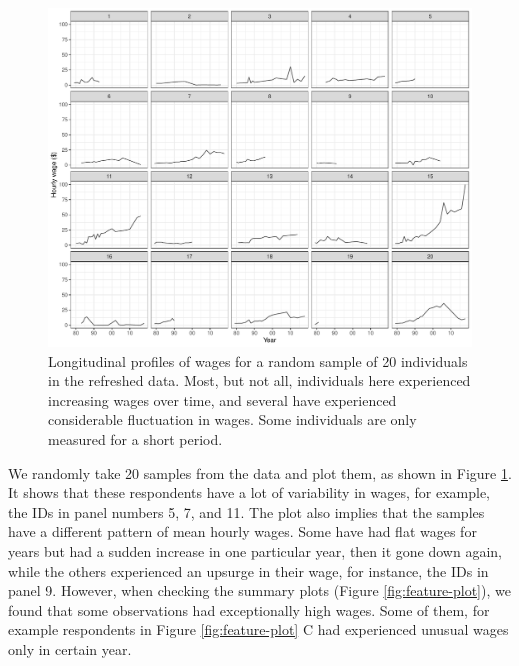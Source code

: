 \documentclass{article}
\begin{document}
\begin{figure}

{\centering \includegraphics[width=1\linewidth]{figures/sample-plot-1} 

}

\caption{Longitudinal profiles of wages for a random sample of 20 individuals in the refreshed data. Most, but not all, individuals here experienced increasing wages over time, and several have experienced considerable fluctuation in wages. Some individuals are only measured for a short period.}\label{fig:sample-plot}
\end{figure}

We randomly take 20 samples from the data and plot them, as shown in Figure \ref{fig:sample-plot}. It shows that these respondents have a lot of variability in wages, for example, the IDs in panel numbers 5, 7, and 11. The plot also implies that the samples have a different pattern of mean hourly wages. Some have had flat wages for years but had a sudden increase in one particular year, then it gone down again, while the others experienced an upsurge in their wage, for instance, the IDs in panel 9.
However, when checking the summary plots (Figure \ref{fig:feature-plot}), we found that some observations had exceptionally high wages. Some of them, for example respondents in Figure \ref {fig:feature-plot} C had experienced unusual wages only in certain year.
\end{document}
